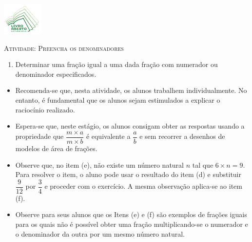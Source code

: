 \documentclass[10 pt,usenames,dvipsnames, oneside]{article}
\begin{document}
\begin{center}
  \begin{minipage}[l]{3cm}
\includegraphics[width=2cm]{../../../Figuras/logo}       
\end{minipage}\hfill
\begin{minipage}[r]{.8\textwidth}
 {\Large \scshape Atividade: Preencha os denominadores}  
\end{minipage}
\end{center}
\vspace{.2cm}

\ifdefined\prof
\begin{goals}
\begin{enumerate}
\item       Determinar uma fração igual a uma dada fração com numerador ou
denominador especificados.
\end{enumerate}

\tcblower

\begin{itemize}
\item       Recomenda-se que, nesta atividade, os alunos trabalhem
individualmente. No entanto, é fundamental que os alunos sejam estimulados a
explicar o raciocínio realizado.
\item       Espera-se que, neste estágio, os alunos consigam obter as
respostas usando a propriedade que       $\dfrac{m \times a}{m \times b}$       é
equivalente a       $\dfrac{a}{b}$       e sem recorrer a desenhos de modelos de
área de frações.
\item       Observe que, no item (e), não existe um número natural       $n$
tal que       $6 \times n = 9$. Para resolver o item, o aluno pode usar o
resultado do item (d) e substituir       $\dfrac{9}{12}$       por
$\dfrac{3}{4}$       e proceder com o exercício. A mesma observação aplica-se ao
item (f).
\item       Observe para seus alunos que os Itens (e) e (f) são exemplos de
frações iguais para os quais não é possível obter uma fração multiplicando-se o
numerador e o denominador da outra por um mesmo número natural.
\end{itemize}
\end{goals}
\end{document}
